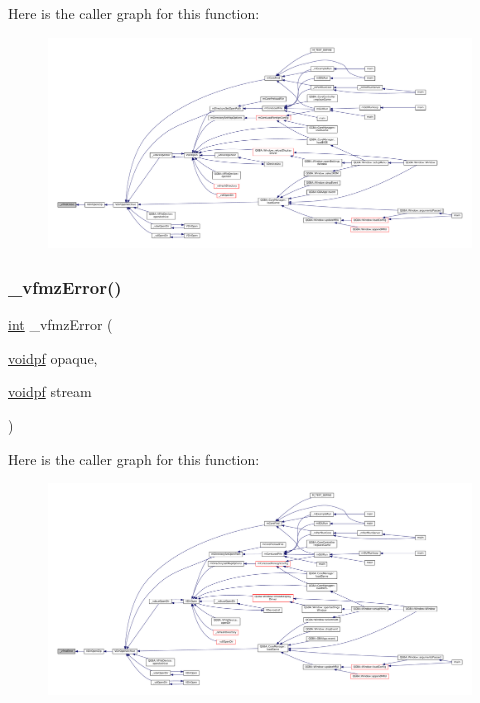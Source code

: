 Here is the caller graph for this function\+:
\nopagebreak
\begin{figure}[H]
\begin{center}
\leavevmode
\includegraphics[width=350pt]{vfs-zip_8c_a31fc3529104f09ba8d094ccef847d08e_icgraph}
\end{center}
\end{figure}
\mbox{\label{vfs-zip_8c_a76e3b8b2ab21cde2127b7a810185f221}} 
\subsubsection{\texorpdfstring{\+\_\+vfmz\+Error()}{\_vfmzError()}}
{\footnotesize\ttfamily \mbox{\hyperlink{ioapi_8h_a787fa3cf048117ba7123753c1e74fcd6}{int}} \+\_\+vfmz\+Error (\begin{DoxyParamCaption}\item[{\mbox{\hyperlink{ioapi_8h_a39ab6d73c1cd44bc17064c2dcbb3e753}{voidpf}}}]{opaque,  }\item[{\mbox{\hyperlink{ioapi_8h_a39ab6d73c1cd44bc17064c2dcbb3e753}{voidpf}}}]{stream }\end{DoxyParamCaption})}

Here is the caller graph for this function\+:
\nopagebreak
\begin{figure}[H]
\begin{center}
\leavevmode
\includegraphics[width=350pt]{vfs-zip_8c_a76e3b8b2ab21cde2127b7a810185f221_icgraph}
\end{center}
\end{figure}
\mbox{\label{vfs-zip_8c_aab51e4c401779a6979ba1574b9f4c714}} 
